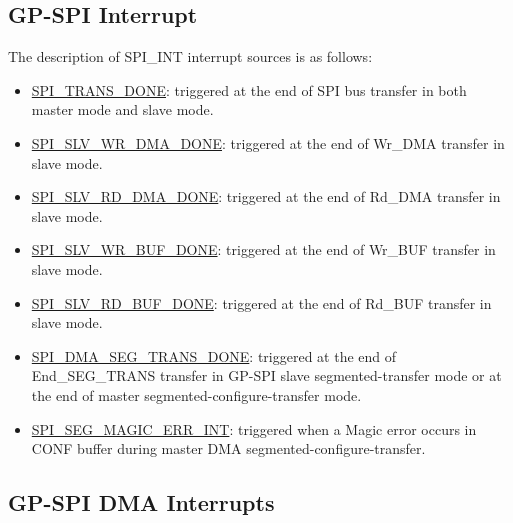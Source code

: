 \documentclass[main\_\_EN.tex]{subfiles}
\begin{document}
\subsection{GP-SPI Interrupt} \label{Section:SPI_INT}

The description of SPI\_INT interrupt sources is as follows:
\begin{itemize}
\item \label{int:SPITRANSDONEINT}\hyperref[fielddesc:SPITRANSDONE]{SPI\_TRANS\_DONE}: triggered at the end of SPI bus transfer in both master mode and slave mode.
\item \label{int:SPISLVWRSTAINT}\hyperref[fielddesc:SPISLVWRDMADONE]{SPI\_SLV\_WR\_DMA\_DONE}: triggered at the end of Wr\_DMA transfer in slave mode.
\item \label{int:SPISLVRDSTAINT}\hyperref[fielddesc:SPISLVRDDMADONE]{SPI\_SLV\_RD\_DMA\_DONE}: triggered at the end of Rd\_DMA transfer in slave mode.
\item \label{int:SPISLVWRBUFINT}\hyperref[fielddesc:SPISLVWRBUFDONE]{SPI\_SLV\_WR\_BUF\_DONE}: triggered at the end of Wr\_BUF transfer in slave mode.
\item \label{int:SPISLVRDBUFINT}\hyperref[fielddesc:SPISLVRDBUFDONE]{SPI\_SLV\_RD\_BUF\_DONE}: triggered at the end of Rd\_BUF transfer in slave mode.
\item \label{int:SPISEGTRANSINT}\hyperref[fielddesc:SPIDMASEGTRANSDONE]{SPI\_DMA\_SEG\_TRANS\_DONE}: triggered at the end of End\_SEG\_TRANS transfer in GP-SPI slave segmented-transfer mode or at the end of master segmented-configure-transfer mode.
\item \hyperref[fielddesc:SPISEGMAGICERR]{SPI\_SEG\_MAGIC\_ERR\_INT}: triggered when a Magic error occurs in CONF buffer during master DMA segmented-configure-transfer.
\end{itemize}

\subsection{GP-SPI DMA Interrupts} \label{Section:SPI_DMA_INT}
\end{document}
